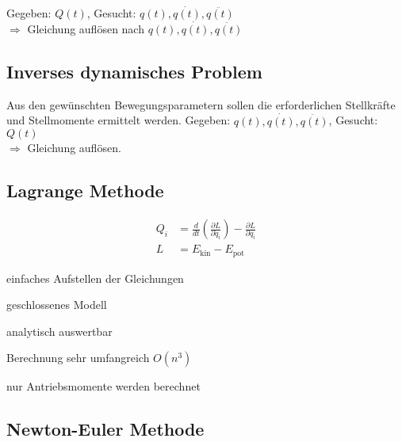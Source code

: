 Gegeben: $Q(t)$, Gesucht: $q(t), \dot{q(t)}, \ddot{q(t)}$ \\
$\Rightarrow$ Gleichung auflösen nach $q(t), \dot{q(t)}, \ddot{q(t)}$
\subsection{Inverses dynamisches Problem}
Aus den gewünschten Bewegungsparametern sollen die erforderlichen Stellkräfte und Stellmomente ermittelt
werden.
Gegeben: $q(t), \dot{q(t)}, \ddot{q(t)}$, Gesucht: $Q(t)$\\
$\Rightarrow$ Gleichung auflösen.

\subsection{Lagrange Methode}
\begin{align}
    Q_i &= \frac{d}{dt}(\frac{\partial L}{\partial \dot{q}_i}) - \frac{\partial L}{\partial q_i} \\
    L &= E_\text{kin} - E_\text{pot}
\end{align}
\begin{compactitem}
    \item einfaches Aufstellen der Gleichungen
    \item geschlossenes Modell
    \item analytisch auswertbar
    \item Berechnung sehr umfangreich $O(n^3)$
    \item nur Antriebsmomente werden berechnet
\end{compactitem}
\subsection{Newton-Euler Methode}
